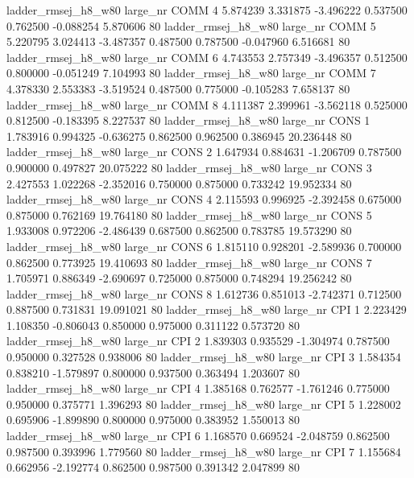 ladder_rmsej_h8_w80   large_nr     COMM                 4  5.874239  3.331875  -3.496222 0.537500 0.762500 -0.088254    5.870606 80
ladder_rmsej_h8_w80   large_nr     COMM                 5  5.220795  3.024413  -3.487357 0.487500 0.787500 -0.047960    6.516681 80
ladder_rmsej_h8_w80   large_nr     COMM                 6  4.743553  2.757349  -3.496357 0.512500 0.800000 -0.051249    7.104993 80
ladder_rmsej_h8_w80   large_nr     COMM                 7  4.378330  2.553383  -3.519524 0.487500 0.775000 -0.105283    7.658137 80
ladder_rmsej_h8_w80   large_nr     COMM                 8  4.111387  2.399961  -3.562118 0.525000 0.812500 -0.183395    8.227537 80
ladder_rmsej_h8_w80   large_nr     CONS                 1  1.783916  0.994325  -0.636275 0.862500 0.962500  0.386945   20.236448 80
ladder_rmsej_h8_w80   large_nr     CONS                 2  1.647934  0.884631  -1.206709 0.787500 0.900000  0.497827   20.075222 80
ladder_rmsej_h8_w80   large_nr     CONS                 3  2.427553  1.022268  -2.352016 0.750000 0.875000  0.733242   19.952334 80
ladder_rmsej_h8_w80   large_nr     CONS                 4  2.115593  0.996925  -2.392458 0.675000 0.875000  0.762169   19.764180 80
ladder_rmsej_h8_w80   large_nr     CONS                 5  1.933008  0.972206  -2.486439 0.687500 0.862500  0.783785   19.573290 80
ladder_rmsej_h8_w80   large_nr     CONS                 6  1.815110  0.928201  -2.589936 0.700000 0.862500  0.773925   19.410693 80
ladder_rmsej_h8_w80   large_nr     CONS                 7  1.705971  0.886349  -2.690697 0.725000 0.875000  0.748294   19.256242 80
ladder_rmsej_h8_w80   large_nr     CONS                 8  1.612736  0.851013  -2.742371 0.712500 0.887500  0.731831   19.091021 80
ladder_rmsej_h8_w80   large_nr      CPI                 1  2.223429  1.108350  -0.806043 0.850000 0.975000  0.311122    0.573720 80
ladder_rmsej_h8_w80   large_nr      CPI                 2  1.839303  0.935529  -1.304974 0.787500 0.950000  0.327528    0.938006 80
ladder_rmsej_h8_w80   large_nr      CPI                 3  1.584354  0.838210  -1.579897 0.800000 0.937500  0.363494    1.203607 80
ladder_rmsej_h8_w80   large_nr      CPI                 4  1.385168  0.762577  -1.761246 0.775000 0.950000  0.375771    1.396293 80
ladder_rmsej_h8_w80   large_nr      CPI                 5  1.228002  0.695906  -1.899890 0.800000 0.975000  0.383952    1.550013 80
ladder_rmsej_h8_w80   large_nr      CPI                 6  1.168570  0.669524  -2.048759 0.862500 0.987500  0.393996    1.779560 80
ladder_rmsej_h8_w80   large_nr      CPI                 7  1.155684  0.662956  -2.192774 0.862500 0.987500  0.391342    2.047899 80
